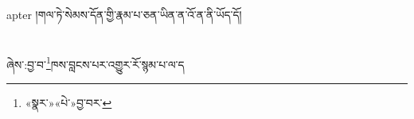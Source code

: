 apter{ }།གལ་ཏེ་སེམས་དོན་གྱི་རྣམ་པ་ཅན་ཡིན་ན་འོ་ན་ནི་ཡོད་དོ།\chapter{ }ཞེས་:བྱ་བ་\footnote{«སྣར་»«པེ་»བྱ་བར་}ཁས་བླངས་པར་འགྱུར་རོ་སྙམ་པ་ལ་ད